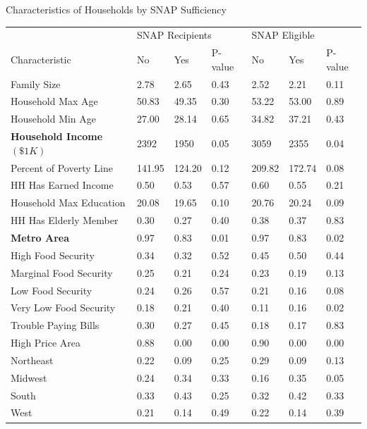 \documentclass{beamer}
\begin{document}


\begin{frame}
\begin{table}{Characteristics of Households by SNAP Sufficiency}%

\begin{adjustbox}{max width=\textwidth}
  \centering
     \begin{tabular}{lllllll}
    \toprule
    & \multicolumn{3}{l}{SNAP Recipients} & \multicolumn{3}{l}{SNAP Eligible} \\

    Characteristic & No    & Yes   & P-value & No    & Yes   & P-value \\
    \midrule
    Family Size & 2.78  & 2.65  & 0.43  & 2.52  & 2.21  & 0.11 \\
    Household Max Age & 50.83 & 49.35 & 0.30  & 53.22 & 53.00 & 0.89 \\
    Household Min Age & 27.00 & 28.14 & 0.65  & 34.82 & 37.21 & 0.43 \\
    \textbf{Household Income $(\$1K)$} & 2392 & 1950 & 0.05  & 3059 & 2355 & 0.04 \\
    Percent of Poverty Line & 141.95 & 124.20 & 0.12  & 209.82 & 172.74 & 0.08 \\
    HH Has Earned Income & 0.50  & 0.53  & 0.57  & 0.60  & 0.55  & 0.21 \\
    Household Max Education & 20.08 & 19.65 & 0.10  & 20.76 & 20.24 & 0.09 \\
    HH Has Elderly Member & 0.30  & 0.27  & 0.40  & 0.38  & 0.37  & 0.83 \\
      \textbf{Metro Area} & 0.97  & 0.83  & 0.01  & 0.97  & 0.83  & 0.02 \\
    High Food Security & 0.34  & 0.32  & 0.52  & 0.45  & 0.50  & 0.44 \\
    Marginal Food Security & 0.25  & 0.21  & 0.24  & 0.23  & 0.19  & 0.13 \\
    Low Food Security & 0.24  & 0.26  & 0.57  & 0.21  & 0.16  & 0.08 \\
    Very Low Food Security & 0.18  & 0.21  & 0.40  & 0.11  & 0.16  & 0.02 \\
    Trouble Paying Bills & 0.30  & 0.27  & 0.45  & 0.18  & 0.17  & 0.83 \\
    High Price Area & 0.88  & 0.00  & 0.00  & 0.90  & 0.00  & 0.00 \\
    Northeast & 0.22  & 0.09  & 0.25  & 0.29  & 0.09  & 0.13 \\
    Midwest & 0.24  & 0.34  & 0.33  & 0.16  & 0.35  & 0.05 \\
    South & 0.33  & 0.43  & 0.25  & 0.32  & 0.42  & 0.33 \\
    West  & 0.21  & 0.14  & 0.49  & 0.22  & 0.14  & 0.39 \\


\end{tabular}
\end{adjustbox}
\end{table}
\end{frame}
\end{document}

